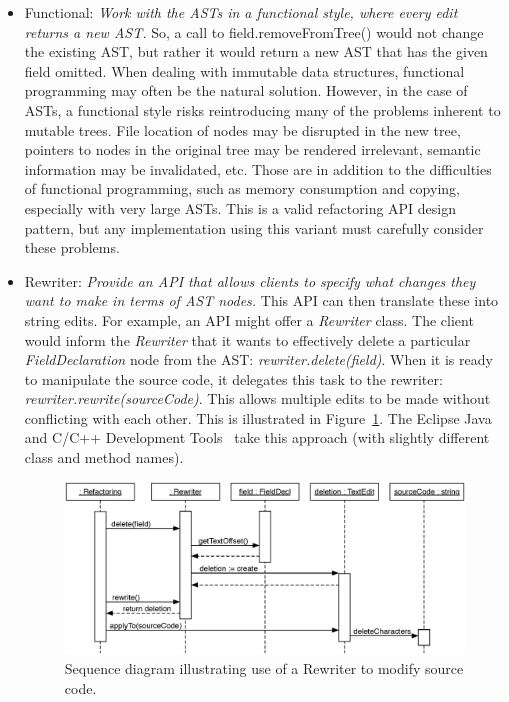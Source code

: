 \documentclass[prodmode]{acmlarge}
\begin{document}
\begin{itemize}

    \item Functional: \textit{Work with the ASTs in a functional style, where every edit
        returns a new AST.} So, a call to field.removeFromTree() would not
        change the existing AST, but rather it would return a new AST that has
        the given field omitted. When dealing with immutable data structures,
        functional programming may often be the natural solution. However,
        in the case of ASTs, a functional style risks reintroducing many of 
        the problems inherent to mutable trees. File location of nodes may
        be disrupted in the new tree, pointers to nodes in the original tree may
        be rendered 
        irrelevant, semantic information may be invalidated, etc. Those are in
        addition to the difficulties of functional programming, such as memory
        consumption and copying, especially with very large ASTs. This is
        a valid refactoring API design pattern, but any implementation using 
        this variant must carefully consider these problems.

    \item Rewriter: \textit{Provide an API that allows clients to specify what changes
        they want to make in terms of AST nodes.}  This API can then translate these into string edits.  For example, an API might offer a \textit{Rewriter} 
class. The client would inform the \textit{Rewriter} that it wants to 
effectively delete a particular \textit{FieldDeclaration} node from the AST:
\textit{rewriter.delete(field)}.  When it is ready to manipulate the source
code, it delegates this task to the rewriter:
\textit{rewriter.rewrite(sourceCode)}.  This allows multiple edits to be made 
without conflicting with each other. This is illustrated in
Figure~\ref{fig:seq-diagram}.  The Eclipse Java and C/C++ Development
Tools~\cite{cdt-refactoring} take this approach (with slightly different class
and method names).

\begin{figure}[!bt]
\begin{center}
\includegraphics[width=.9\textwidth]{seq-diagram.eps}
\end{center}
\caption{Sequence diagram illustrating use of a Rewriter to modify source code.}
\label{fig:seq-diagram}
\end{figure}

\end{itemize}
\end{document}
